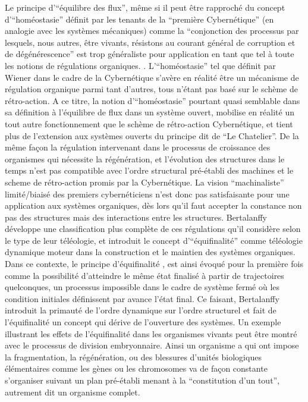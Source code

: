 Le principe d'\enquote{équilibre des flux}, même si il peut être rapproché du concept d'\enquote{homéostasie} définit par les tenants de la \enquote{première Cybernétique} (en analogie avec les systèmes mécaniques) comme la \enquote{conjonction des processus par lesquels, nous autres, être vivants, résistons au courant général de corruption et de dégénérescence} est trop généraliste pour application en tant que tel à toute les notions de régulations organiques. \autocite[194]{Morin1977} \autocite{Wiener1950}. L'\enquote{homéostasie} tel que définit par Wiener dans le cadre de la Cybernétique s'avère en réalité être un mécanisme de régulation organique parmi tant d'autres, tous n'étant pas basé sur le schème de rétro-action. A ce titre, la notion d'\enquote{homéostasie} pourtant quasi semblable dans sa définition à l'équilibre de flux dans un système ouvert, mobilise en réalité un tout autre fonctionnement que le schème de rétro-action Cybernétique, et tient plus de l'extension aux systèmes ouverts du principe dit de \enquote{Le Chatelier}. De la même façon la régulation intervenant dans le processus de croissance des organismes qui nécessite la régénération, et l'évolution des structures dans le temps n'est pas compatible avec l'ordre structural pré-établi des machines et le scheme de rétro-action promis par la Cybernétique. La vision \enquote{machinaliste} limité/biaisé des premiers cybernéticiens n'est donc pas satisfaisante pour une application aux systèmes organiques, dès lors qu'il faut accepter la constance non pas des structures mais des interactions entre les structures. Bertalanffy développe une classification plus complète de ces régulations qu'il considère selon le type de leur téléologie, et introduit le concept d'\enquote{équifinalité} comme téléologie dynamique moteur dans la construction et le maintien des systèmes organiques. Dans ce contexte, le principe d'équifinalité \autocite[131]{Pouvreau2013}, est ainsi évoqué pour la première fois comme la possibilité d'atteindre le même état finalisé à partir de trajectoires quelconques, un processus impossible dans le cadre de système fermé où les condition initiales définissent par avance l'état final. Ce faisant, Bertalanffy introduit la primauté de l'ordre dynamique sur l'ordre structurel et fait de l'équifinalité un concept qui dérive de l'ouverture des systèmes. \autocite[489]{Pouvreau2013} \autocite[647]{Pouvreau2013} Un exemple illustrant les effets de l'équifinalité dans les organismes vivants peut être montré avec le processus de division embryonnaire. Ainsi un organisme a qui ont impose la fragmentation, la régénération, ou des blessures d'unités biologiques élémentaires comme les gènes ou les chromosomes va de façon constante s'organiser suivant un plan pré-établi menant à la \enquote{constitution d'un tout}, autrement dit un organisme complet. 

